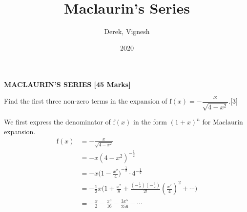 \documentclass[12pt, a4 paper]{article}
\title{Maclaurin's Series}
\author{Derek, Vignesh}
\date{2020}
\begin{document}
\maketitle

\textbf{MACLAURIN'S SERIES [45 Marks]}
\begin{outline}[enumerate]
 \1 Find the first three non-zero terms in the expansion of \(\textrm{f}(x)=-\dfrac{x}{\sqrt{4-x^2}}\).\hfill[3] %
 \begin{answer}
  We first express the denominator of \(\textrm{f}(x)\) in the form \({(1+x)}^n\) for Maclaurin expansion.
  \begin{align*}
   \textrm{f}(x) & =-\frac{x}{\sqrt{4-x^2}}                                                                                                                    \\
                 & = -x{(4-x^2)}^{-\frac{1}{2}}                                                                                                                \\
                 & = -x{\Big(1-\frac{x^2}{4}\Big)}^{-\frac{1}{2}}\cdot{4}^{-\frac{1}{2}}                                                                       \\
                 & = -\frac{1}{2}x\Big(1+\frac{x^2}{8}+\frac{\left(-\frac{1}{2}\right)\left(-\frac{3}{2}\right)}{2!}{\left(\frac{x^2}{4}\right)}^2+\cdots\Big) \\
                 & = -\frac{x}{2} - \frac{x^3}{16} - \frac{3x^5}{256} - \cdots
  \end{align*}
 \end{answer}


\end{outline}
\end{document}

